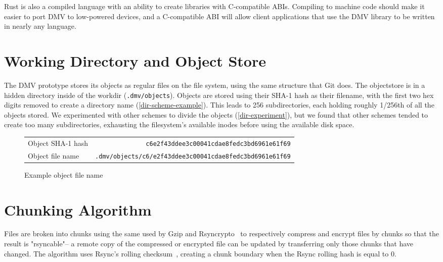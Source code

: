 
Rust is also a compiled language with an ability to create libraries with
C-compatible \glspl{ABI}. Compiling to machine code should make it easier to
port \gls{DMV} to low-powered devices, and a C-compatible \gls{ABI} will allow
client applications that use the \gls{DMV} library to be written in nearly any
language.

%



\section{Working Directory and Object Store}\label{dir-impl}

The \gls{DMV} prototype stores its objects as regular files on the file system,
using the same structure that Git does. The \gls{objectstore} is in a hidden
directory inside of the \gls{workdir} (\lstinline{.dmv/objects}). Objects are
stored using their SHA-1 hash as their filename, with the first two hex digits
removed to create a directory name (\autoref{dir-scheme-example}). This leads to
\num{256} subdirectories, each holding roughly \num{1/256}th of all the objects
stored. We experimented with other schemes to divide the objects
(\autoref{dir-experiment}), but we found that other schemes tended to create too
many subdirectories, exhausting the filesystem's available \glspl{inode} before
using the available disk space.

\begin{figure}[h]
    \caption{Example object file name}
    \label{dir-scheme-example}
    \begin{tabular}{ l r }
        Object SHA-1 hash & \lstinline{c6e2f43ddee3c00041cdae8fedc3bd6961e61f69} \\
        Object file name & \lstinline{.dmv/objects/c6/e2f43ddee3c00041cdae8fedc3bd6961e61f69} \\
    \end{tabular}
\end{figure}

%


\section{Chunking Algorithm}\label{chunking-algorithm}

Files are broken into chunks using the same  used by Gzip
and Rsyncrypto~\cite{rsyncrypto_algorithm} to respectively compress and encrypt
files by chunks so that the result is "rsyncable"-- a remote copy of the
compressed or encrypted file can be updated by transferring only those chunks
that have changed. The algorithm uses Rsync's rolling
checksum~\cite{rsynctechreport}, creating a chunk boundary when the Rsync
rolling hash is equal to \num{0}.

